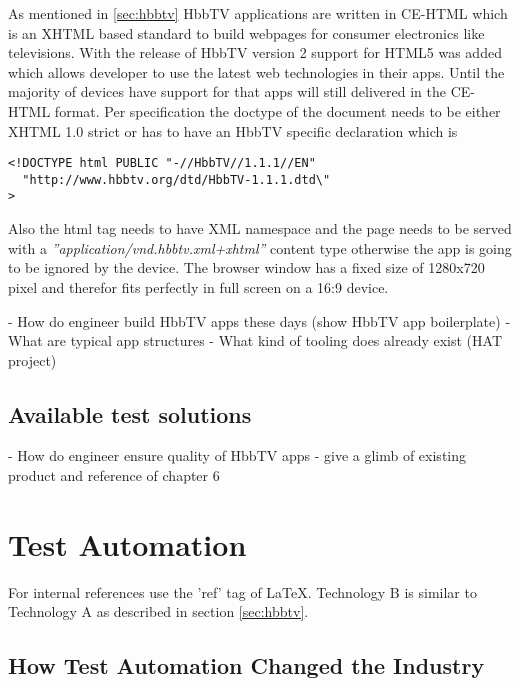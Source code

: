 As mentioned in \ref{sec:hbbtv} HbbTV applications are written in CE-HTML which is an XHTML
based standard to build webpages for consumer electronics like televisions. With the release
of HbbTV version 2 support for HTML5 was added which allows developer to use the latest
web technologies in their apps. Until the majority of devices have support for that apps will
still delivered in the CE-HTML format. Per specification the doctype of the document needs
to be either XHTML 1.0 strict or has to have an HbbTV specific declaration which is

\vspace{1cm}
\begin{lstlisting}[caption=HbbTV Doctype Declaration,label=doctype]
<!DOCTYPE html PUBLIC "-//HbbTV//1.1.1//EN"
  "http://www.hbbtv.org/dtd/HbbTV-1.1.1.dtd\"
>
\end{lstlisting}
\vspace{0.5cm}

Also the html tag needs to have XML namespace and the page needs to be served with a
\textit{''application/vnd.hbbtv.xml+xhtml''} content type otherwise the app is going to be
ignored by the device. The browser window has a fixed size of 1280x720 pixel and therefor
fits perfectly in full screen on a 16:9 device.

- How do engineer build HbbTV apps these days (show HbbTV app boilerplate)
- What are typical app structures
- What kind of tooling does already exist (HAT project)

\subsection{Available test solutions\label{sec:availabletestsolutions}}

- How do engineer ensure quality of HbbTV apps
- give a glimb of existing product and reference of chapter 6

\section{Test Automation\label{sec:testautomation}}

For internal references use the 'ref' tag of LaTeX. Technology B is similar to Technology A
as described in section \ref{sec:hbbtv}.

\subsection{How Test Automation Changed the Industry\label{sec:howitchanged}}

